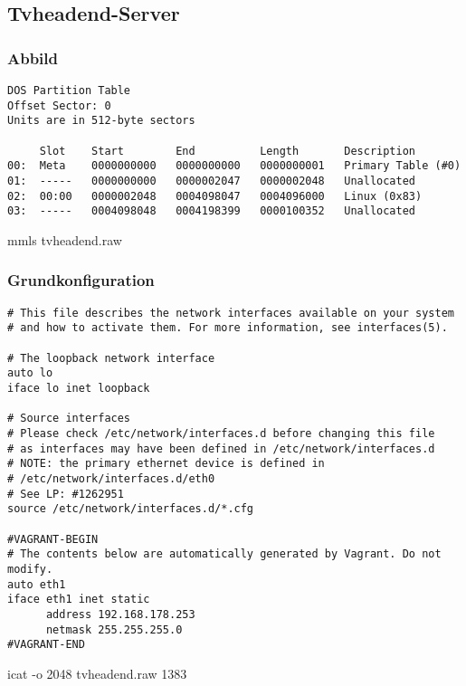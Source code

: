 \subsection{Tvheadend-Server}

\subsubsection{Abbild}

\begin{cmd}[H]
\begin{verbatim}
DOS Partition Table
Offset Sector: 0
Units are in 512-byte sectors

     Slot    Start        End          Length       Description
00:  Meta    0000000000   0000000000   0000000001   Primary Table (#0)
01:  -----   0000000000   0000002047   0000002048   Unallocated
02:  00:00   0000002048   0004098047   0004096000   Linux (0x83)
03:  -----   0004098048   0004198399   0000100352   Unallocated
\end{verbatim}
\caption{mmls tvheadend.raw}
\label{cmd:tvheadend-mmls}
\end{cmd}

\subsubsection{Grundkonfiguration}

\begin{cmd}[H]
\begin{verbatim}
# This file describes the network interfaces available on your system
# and how to activate them. For more information, see interfaces(5).

# The loopback network interface
auto lo
iface lo inet loopback

# Source interfaces
# Please check /etc/network/interfaces.d before changing this file
# as interfaces may have been defined in /etc/network/interfaces.d
# NOTE: the primary ethernet device is defined in
# /etc/network/interfaces.d/eth0
# See LP: #1262951
source /etc/network/interfaces.d/*.cfg

#VAGRANT-BEGIN
# The contents below are automatically generated by Vagrant. Do not modify.
auto eth1
iface eth1 inet static
      address 192.168.178.253
      netmask 255.255.255.0
#VAGRANT-END
\end{verbatim}
\caption{icat -o 2048 tvheadend.raw 1383}
\label{cmd:tvheadend-interfaces}
\end{cmd}

